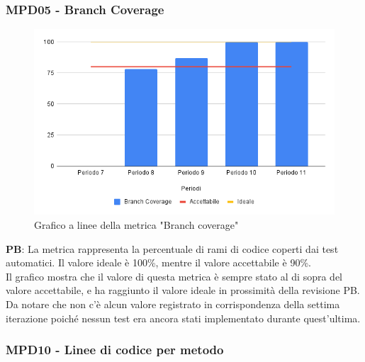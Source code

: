 \documentclass[10pt]{article}
\begin{document}
\begin{justify}
\subsubsection{MPD05 - Branch Coverage}

\begin{figure}[H]
  \centering
  \includegraphics[width=0.9\linewidth]{BranchCoverage.png}
  \caption{Grafico a linee della metrica "Branch coverage"}
\end{figure}

\textbf{PB}: La metrica rappresenta la percentuale di rami di codice coperti dai test automatici. Il valore ideale è 100\%, mentre il valore accettabile è 90\%.\\
Il grafico mostra che il valore di questa metrica è sempre stato al di sopra del valore accettabile, e ha raggiunto il valore ideale in prossimità della revisione PB.\\
Da notare che non c'è alcun valore registrato in corrispondenza della settima iterazione poiché nessun test era ancora stati implementato durante quest'ultima.\\


\subsubsection{MPD10 - Linee di codice per metodo}


\end{justify}
\end{document}
